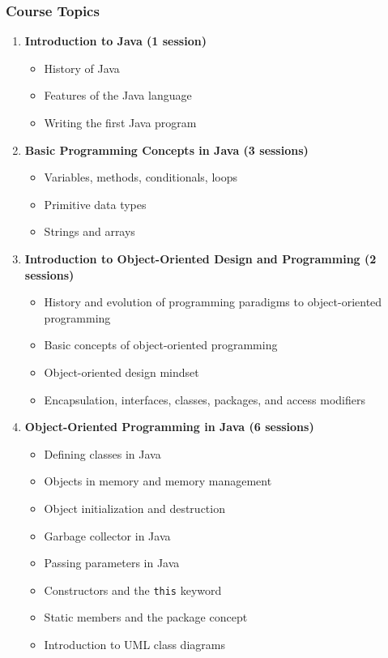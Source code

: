 \documentclass[12pt]{article}
\begin{document}
\subsubsection*{Course Topics}
\begin{enumerate}
    \item \textbf{Introduction to Java (1 session)}
        \begin{itemize}
            \item History of Java
            \item Features of the Java language
            \item Writing the first Java program
        \end{itemize}
    
    \item \textbf{Basic Programming Concepts in Java (3 sessions)}
        \begin{itemize}
            \item Variables, methods, conditionals, loops
            \item Primitive data types
            \item Strings and arrays
        \end{itemize}
    
    \item \textbf{Introduction to Object-Oriented Design and Programming (2 sessions)}
        \begin{itemize}
            \item History and evolution of programming paradigms to object-oriented programming
            \item Basic concepts of object-oriented programming
            \item Object-oriented design mindset
            \item Encapsulation, interfaces, classes, packages, and access modifiers
        \end{itemize}
    
    \item \textbf{Object-Oriented Programming in Java (6 sessions)}
        \begin{itemize}
            \item Defining classes in Java
            \item Objects in memory and memory management
            \item Object initialization and destruction
            \item Garbage collector in Java
            \item Passing parameters in Java
            \item Constructors and the \texttt{this} keyword
            \item Static members and the package concept
            \item Introduction to UML class diagrams
        \end{itemize}
    

\end{enumerate}
\end{document}
